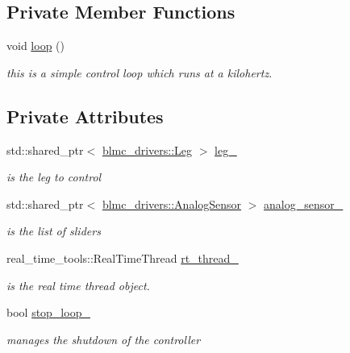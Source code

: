 \subsection*{Private Member Functions}
\begin{DoxyCompactItemize}
\item 
void \hyperlink{classLegController_a00000dd7bbaa4f1e05a9ea16f05e73e8}{loop} ()
\begin{DoxyCompactList}\small\item\em this is a simple control loop which runs at a kilohertz. \end{DoxyCompactList}\end{DoxyCompactItemize}
\subsection*{Private Attributes}
\begin{DoxyCompactItemize}
\item 
\mbox{\label{classLegController_af2abd6d8c18c9653813bb231a0688a54}} 
std\+::shared\+\_\+ptr$<$ \hyperlink{classblmc__drivers_1_1Leg}{blmc\+\_\+drivers\+::\+Leg} $>$ \hyperlink{classLegController_af2abd6d8c18c9653813bb231a0688a54}{leg\+\_\+}
\begin{DoxyCompactList}\small\item\em is the leg to control \end{DoxyCompactList}\item 
\mbox{\label{classLegController_a1a05529b6f3f40c7d3da6e6a9fa94cea}} 
std\+::shared\+\_\+ptr$<$ \hyperlink{classblmc__drivers_1_1AnalogSensor}{blmc\+\_\+drivers\+::\+Analog\+Sensor} $>$ \hyperlink{classLegController_a1a05529b6f3f40c7d3da6e6a9fa94cea}{analog\+\_\+sensor\+\_\+}
\begin{DoxyCompactList}\small\item\em is the list of sliders \end{DoxyCompactList}\item 
\mbox{\label{classLegController_a34aac27ee8efb204f98203b553094588}} 
real\+\_\+time\+\_\+tools\+::\+Real\+Time\+Thread \hyperlink{classLegController_a34aac27ee8efb204f98203b553094588}{rt\+\_\+thread\+\_\+}
\begin{DoxyCompactList}\small\item\em is the real time thread object. \end{DoxyCompactList}\item 
\mbox{\label{classLegController_a991995e57f3581074b9c0eec32966e35}} 
bool \hyperlink{classLegController_a991995e57f3581074b9c0eec32966e35}{stop\+\_\+loop\+\_\+}
\begin{DoxyCompactList}\small\item\em manages the shutdown of the controller \end{DoxyCompactList}\end{DoxyCompactItemize}


